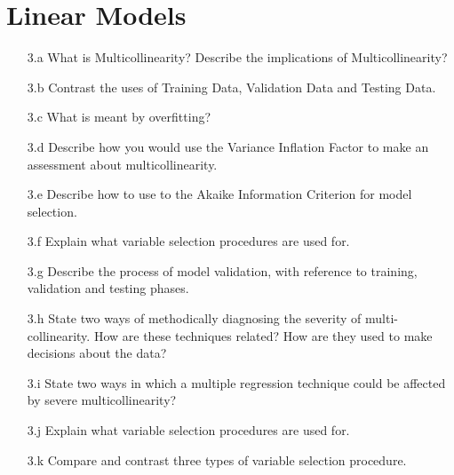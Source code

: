 \documentclass[a4paper,12pt]{article}
\begin{document}
\section*{Linear Models}
\begin{itemize}

\item[3.a] What is Multicollinearity? Describe the implications of Multicollinearity?
\item[3.b] Contrast the uses of Training Data, Validation Data and Testing Data.
\item[3.c] What is meant by overfitting?
\item[3.d] Describe how you would use the Variance Inflation Factor to make an assessment about multicollinearity.
\item[3.e] Describe how to use to the Akaike Information Criterion for model selection.
\item[3.f] Explain what variable selection procedures are used for.
\item[3.g] Describe the process of model validation, with reference to training, validation and testing phases.
\item[3.h] State two ways of methodically diagnosing the severity of multi-collinearity. How are these techniques related? How are they used to make decisions about the data?
\item[3.i] State two ways in which a multiple regression technique could be affected by severe multicollinearity?
\item[3.j] Explain what variable selection procedures are used for.
\item[3.k] Compare and contrast three types of variable selection procedure.
\end{itemize}
\end{document}
